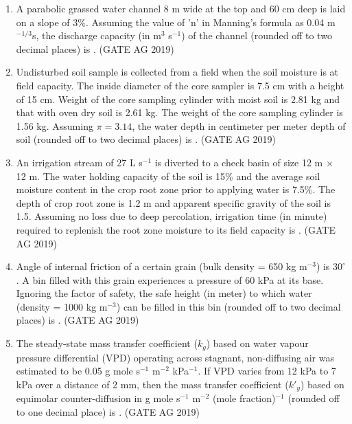 \documentclass[journal,12pt,onecolumn]{IEEEtran}
\theoremstyle{remark}
\begin{document}
\begin{enumerate}
\item 
A parabolic grassed water channel 8 m wide at the top and 60 cm deep is laid on a slope of 3\%. Assuming the value of 'n' in Manning's formula as 0.04 m$^{-1/3}$s, the discharge capacity (in m$^{3}$ s$^{-1}$) of the channel (rounded off to two decimal places) is \underline{\hspace{2cm}}.
\hfill{(GATE AG 2019)}

\item 
Undisturbed soil sample is collected from a field when the soil moisture is at field capacity. The inside diameter of the core sampler is 7.5 cm with a height of 15 cm. Weight of the core sampling cylinder with moist soil is 2.81 kg and that with oven dry soil is 2.61 kg. The weight of the core sampling cylinder is 1.56 kg. Assuming $\pi = 3.14$, the water depth in centimeter per meter depth of soil (rounded off to two decimal places) is \underline{\hspace{2cm}}.
\hfill{(GATE AG 2019)}

\item 
An irrigation stream of 27 L s$^{-1}$ is diverted to a check basin of size 12 m $\times$ 12 m. The water holding capacity of the soil is 15\% and the average soil moisture content in the crop root zone prior to applying water is 7.5\%. The depth of crop root zone is 1.2 m and apparent specific gravity of the soil is 1.5. Assuming no loss due to deep percolation, irrigation time (in minute) required to replenish the root zone moisture to its field capacity is \underline{\hspace{2cm}}.
\hfill{(GATE AG 2019)}

\item 
Angle of internal friction of a certain grain (bulk density = 650 kg m$^{-3}$) is $30^\circ$. A bin filled with this grain experiences a pressure of 60 kPa at its base. Ignoring the factor of safety, the safe height (in meter) to which water (density = 1000 kg m$^{-3}$) can be filled in this bin (rounded off to two decimal places) is \underline{\hspace{2cm}}.
\hfill{(GATE AG 2019)}

\item 
The steady-state mass transfer coefficient ($k_g$) based on water vapour pressure differential (VPD) operating across stagnant, non-diffusing air was estimated to be 0.05 g mole s$^{-1}$ m$^{-2}$ kPa$^{-1}$. If VPD varies from 12 kPa to 7 kPa over a distance of 2 mm, then the mass transfer coefficient ($k'_y$) based on equimolar counter-diffusion in g mole s$^{-1}$ m$^{-2}$ (mole fraction)$^{-1}$ (rounded off to one decimal place) is \underline{\hspace{2cm}}.
\hfill{(GATE AG 2019)}


\end{enumerate}
\end{document}
